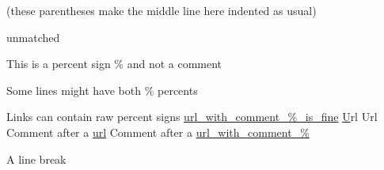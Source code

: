 \documentclass{article}
\begin{document}
(these parentheses
  make the middle line here
indented as usual)


unmatched %

This is a percent sign \% and not a comment

Some lines might have both \% percents %

Links can contain raw percent signs
\url{url_with_comment_%_is_fine}
\href{url_with_comment_%_is_fine}
Url %
Url %
Comment after a \url{url} %
Comment after a \url{url_with_comment_%} %

A line break \\%
\end{document}
